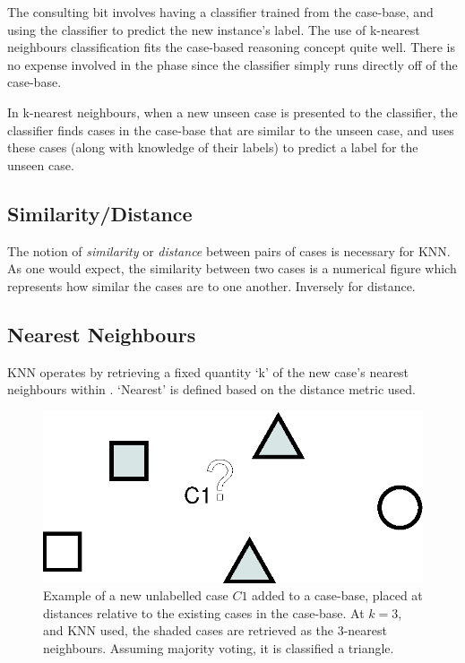 \documentclass[a4paper,11pt]{report}
\begin{document}
The consulting bit involves having a classifier trained from the case-base, and using the classifier to predict the new instance's label. The use of k-nearest neighbours classification fits the case-based reasoning concept quite well. There is no expense involved in the phase since the classifier simply runs directly off of the case-base.

In k-nearest neighbours, when a new unseen case is presented to the classifier, the classifier finds cases in the case-base that are similar to the unseen case, and uses these cases (along with knowledge of their labels) to predict a label for the unseen case.

\subsection{Similarity/Distance}

The notion of \emph{similarity} or \emph{distance} between pairs of cases is necessary for KNN. As one would expect, the similarity between two cases is a numerical figure which represents how similar the cases are to one another. Inversely for distance.

\subsection{Nearest Neighbours}

KNN operates by retrieving a fixed quantity `k' of the new case's nearest neighbours within . `Nearest' is defined based on the distance metric used.

\begin{figure}[h!] 
\centering
\includegraphics[scale=0.5]{./Drawn/KnnExample}
\caption{Example of a new unlabelled case $C1$ added to a case-base, placed at distances relative to the existing cases in the case-base. At $k=3$, and KNN used, the shaded cases are retrieved as the 3-nearest neighbours. Assuming majority voting, it is classified a triangle.}
\label{fig:knnexample}
\end{figure}
\end{document}
